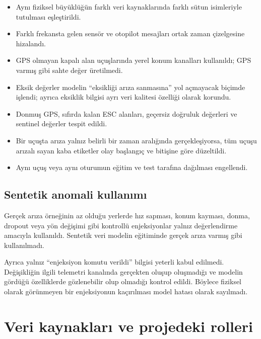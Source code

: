 \documentclass[11pt,a4paper]{article}
\begin{document}
\begin{itemize}
  \item Aynı fiziksel büyüklüğün farklı veri kaynaklarında farklı sütun
  isimleriyle tutulması eşleştirildi.
  \item Farklı frekansta gelen sensör ve otopilot mesajları ortak zaman çizelgesine
  hizalandı.
  \item GPS olmayan kapalı alan uçuşlarında yerel konum kanalları kullanıldı;
  GPS varmış gibi sahte değer üretilmedi.
  \item Eksik değerler modelin ``eksikliği arıza sanmasına'' yol açmayacak biçimde
  işlendi; ayrıca eksiklik bilgisi ayrı veri kalitesi özelliği olarak korundu.
  \item Donmuş GPS, sıfırda kalan ESC alanları, geçersiz doğruluk değerleri ve
  sentinel değerler tespit edildi.
  \item Bir uçuşta arıza yalnız belirli bir zaman aralığında gerçekleşiyorsa,
  tüm uçuşu arızalı sayan kaba etiketler olay başlangıç ve bitişine göre düzeltildi.
  \item Aynı uçuş veya aynı oturumun eğitim ve test tarafına dağılması engellendi.
\end{itemize}

\subsection{Sentetik anomali kullanımı}

Gerçek arıza örneğinin az olduğu yerlerde hız sapması, konum kayması, donma,
dropout veya yön değişimi gibi kontrollü enjeksiyonlar yalnız değerlendirme
amacıyla kullanıldı. Sentetik veri modelin eğitiminde gerçek arıza varmış gibi
kullanılmadı.

Ayrıca yalnız ``enjeksiyon komutu verildi'' bilgisi yeterli kabul edilmedi.
Değişikliğin ilgili telemetri kanalında gerçekten oluşup oluşmadığı ve modelin
gördüğü özelliklerde gözlenebilir olup olmadığı kontrol edildi. Böylece fiziksel
olarak görünmeyen bir enjeksiyonun kaçırılması model hatası olarak sayılmadı.

\section{Veri kaynakları ve projedeki rolleri}
\end{document}
